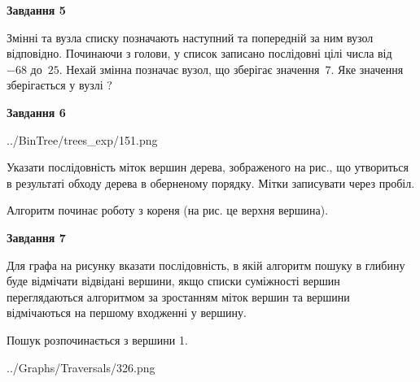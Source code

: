 \documentclass[12pt, ukrainian]{article}
\begin{document}
{\begin {large}
{\begin {center}\textbf{Завдання 5}\end {center}}\par
Змінні  та  вузла списку позначають наступний та попередній за ним вузол відповідно. Починаючи з голови, у список записано послідовні цілі числа від~$-68$ до~$25$. Нехай змінна  позначає вузол, що зберігає значення~$7$.
Яке значення зберігається у вузлі  ?\par
\newpage

{\begin {center}\textbf{Завдання 6}\end {center}}\par

\begin{center}
	{../BinTree/trees_exp/151.png}
\end{center}
Указати послідовність міток вершин дерева, зображеного на рис., що утвориться в результаті обходу дерева в оберненому порядку. Мітки записувати через пробіл.\par Алгоритм починає роботу з кореня (на рис. це верхня вершина).\par
\newpage

{\begin {center}\textbf{Завдання 7}\end {center}}\par
Для графа на рисунку вказати послідовність, в якій алгоритм пошуку в глибину буде відмічати відвідані вершини, якщо списки суміжності вершин переглядаються алгоритмом за зростанням міток вершин та вершини відмічаються на першому вход\-женні у вершину.\par
Пошук розпочинається з вершини 1.\par

\begin{center}
	{../Graphs/Traversals/326.png}
\end{center}\par
\newpage


\end{large}}
\end{document}
